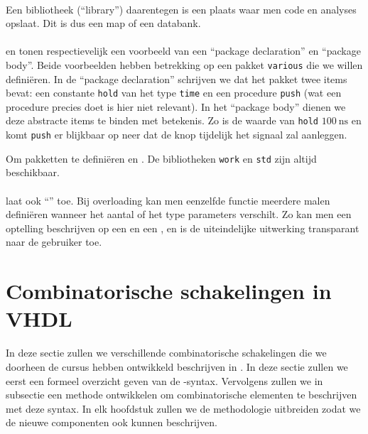 \paragraph{}
Een bibliotheek (``library'') daarentegen is een plaats waar men code en analyses opslaat. Dit is dus een map of een databank.

\paragraph{}


 en  tonen respectievelijk een voorbeeld van een ``package declaration'' en ``package body''. Beide voorbeelden hebben betrekking op een pakket \texttt{various} die we willen defini\"eren. In de ``package declaration'' schrijven we dat het pakket twee items bevat: een constante \texttt{hold} van het type \texttt{time} en een procedure \texttt{push} (wat een procedure precies doet is hier niet relevant). In het ``package body'' dienen we deze abstracte items te binden met betekenis. Zo is de waarde van \texttt{hold} $100~\mbox{ns}$ en komt \texttt{push} er blijkbaar op neer dat de knop tijdelijk het signaal  zal aanleggen.

Om pakketten te defini\"eren en . De bibliotheken \texttt{work} en \texttt{std} zijn altijd beschikbaar.

\paragraph{}
\tvhdl{} laat ook ``'' toe. Bij overloading kan men eenzelfde functie meerdere malen defini\"eren wanneer het aantal of het type parameters verschilt. Zo kan men een optelling beschrijven op een  en een , en is de uiteindelijke uitwerking transparant naar de gebruiker toe.

\section{Combinatorische schakelingen in VHDL}

In deze sectie zullen we verschillende combinatorische schakelingen die we doorheen de cursus hebben ontwikkeld beschrijven in \tvhdl{}. In deze sectie zullen we eerst een formeel overzicht geven van de \tvhdl{}-syntax. Vervolgens zullen we in subsectie  een methode ontwikkelen om combinatorische elementen te beschrijven met deze syntax. In elk hoofdstuk zullen we de methodologie uitbreiden zodat we de nieuwe componenten ook kunnen beschrijven.

